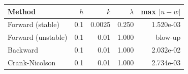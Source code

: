 \begin{tabular}{l r r r r}\hline
Method & $h$ & $k$ & $\lambda$ & max $|u - w|$ \\
\hline
Forward (stable) & 0.1 & 0.0025 & 0.250 & 1.520e-03 \\
Forward (unstable) & 0.1 & 0.01 & 1.000 & blow-up \\
Backward & 0.1 & 0.01 & 1.000 & 2.032e-02 \\
Crank-Nicolson & 0.1 & 0.01 & 1.000 & 2.734e-03 \\
\hline
\end{tabular}
